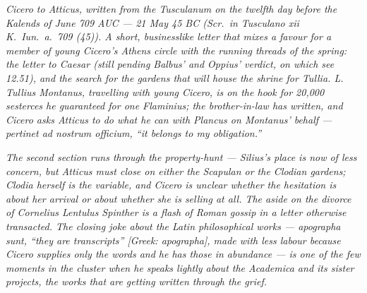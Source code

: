
\textit{Cicero to Atticus, written from the Tusculanum
on the twelfth day before the Kalends of June 709 AUC
--- 21 May 45 BC (\textit{Scr.\ in Tusculano xii K.\
Iun.\ a.\ 709 (45)}). A short, businesslike letter
that mixes a favour for a member of young Cicero's
Athens circle with the running threads of the spring:
the letter to Caesar (still pending Balbus' and
Oppius' verdict, on which see 12.51), and the search
for the gardens that will house the shrine for
Tullia. L. Tullius Montanus, travelling with young
Cicero, is on the hook for 20{,}000 sesterces he
guaranteed for one Flaminius; the brother-in-law has
written, and Cicero asks Atticus to do what he can
with Plancus on Montanus' behalf --- \textit{pertinet
ad nostrum officium}, ``it belongs to my obligation.''}

\textit{The second section runs through the
property-hunt --- Silius's place is now of less
concern, but Atticus must close on either the
Scapulan or the Clodian gardens; Clodia herself is
the variable, and Cicero is unclear whether the
hesitation is about her arrival or about whether she
is selling at all. The aside on the divorce of
Cornelius Lentulus Spinther is a flash of Roman
gossip in a letter otherwise transacted. The closing
joke about the Latin philosophical works ---
\textit{apographa sunt}, ``they are transcripts''
\textit{[Greek: apographa]}, made with less labour
because Cicero supplies only the words and he has
those in abundance --- is one of the few moments in
the cluster when he speaks lightly about the
\textit{Academica} and its sister projects, the works
that are getting written through the grief.}
